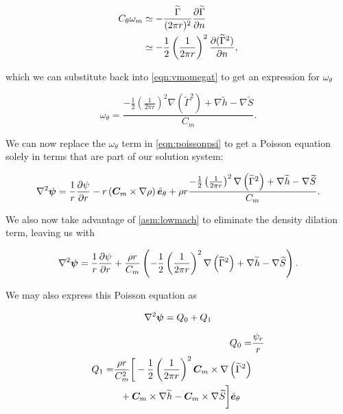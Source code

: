 \begin{equation}
\begin{aligned}
    C_\theta \omega_m &\simeq - \frac{\widetilde{\Gamma}}{(2 \pi r)^2} \frac{\partial \widetilde{\Gamma}}{\partial n} \\
                      &\simeq - \frac{1}{2} \left(\frac{1}{2 \pi r}\right)^2 \frac{\partial (\widetilde{\Gamma}^2)}{\partial n},
\end{aligned}
\end{equation}


\noindent which we can substitute back into \cref{eqn:vmomegat} to get an expression for \(\omega_\theta\)

\begin{equation}
    \omega_\theta = \frac{- \frac{1}{2} \left(\frac{1}{2 \pi r}\right)^2 \nabla\left(\widetilde{\Gamma}^2\right) + \nabla\widetilde{h} - \nabla\widetilde{S}}{C_m}.
\end{equation}

\noindent We can now replace the \(\omega_\theta\) term in \cref{eqn:poissonpsi} to get a Poisson equation solely in terms that are part of our solution system:

\begin{equation}
    \nabla^2\bm{\psi} = \frac{1}{r} \frac{\partial \psi}{\partial r} - r \left(\bm{C}_m \times \nabla\rho\right) \hat{\bm{e}}_\theta + \rho r \frac{- \frac{1}{2} \left(\frac{1}{2 \pi r}\right)^2 \nabla\left(\widetilde{\Gamma}^2\right) + \nabla\widetilde{h} - \nabla\widetilde{S}}{C_m}.
\end{equation}

\noindent We also now take advantage of \cref{asm:lowmach} to eliminate the density dilation term, leaving us with

\begin{equation}
    \label{eqn:poissonpsi1}
    \nabla^2\bm{\psi} = \frac{1}{r} \frac{\partial \psi}{\partial r} + \frac{\rho r}{C_m} \left(- \frac{1}{2} \left(\frac{1}{2 \pi r}\right)^2 \nabla\left(\widetilde{\Gamma}^2\right) + \nabla\widetilde{h} - \nabla\widetilde{S}\right).
\end{equation}

\noindent We may also express this Poisson equation as

\begin{equation}
\label{eqn:poissonpsi2}
\nabla^2 \bm{\psi} = Q_0 + Q_1
\end{equation}

\where

\begin{align}
Q_0 =& \frac{\psi_r}{r} \\
\begin{split}
    Q_1 =& \frac{\rho r}{C_m^2} \biggr[ - \frac{1}{2} \left(\frac{1}{2 \pi r}\right)^2 \bm{C}_m \times \nabla\left(\widetilde{\Gamma}^2\right) \\
         &~~+ \bm{C}_m \times \nabla \widetilde{h} - \bm{C}_m \times \nabla \widetilde{S} \biggr]\hat{\bm{e}}_\theta
\end{split}
\end{align}

